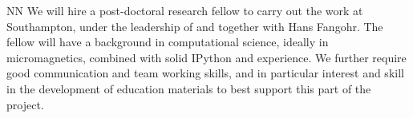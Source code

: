 \begin{participant}[type=res, PM=32]{NN}
  We will hire a post-doctoral research fellow to carry out the work
  at Southampton, under the leadership of and together with Hans
  Fangohr. The fellow will have a background in computational science,
  ideally in micromagnetics, combined with solid IPython and
  \Jupyter{} experience. We further require good communication and
  team working skills, and in particular interest and skill in the
  development of education materials to best support this part of the
  project.
\end{participant}